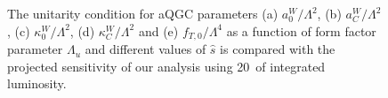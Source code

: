 \begin{figure}[hb]
\begin{center}
{    }
    \caption{\label{aqgc:uniBand} The unitarity condition for aQGC
    parameters (a) $a_0^W/\Lambda^2$, (b) $a_{C}^{W}/\Lambda^{2}$, (c) $\kappa_0^W/\Lambda^2$, (d) $\kappa_{C}^{W}/\Lambda^{2}$ and
    (e) $f_{T,0}/\Lambda^{4}$ as a function of form factor parameter
    $\Lambda_{u}$ and different values of $\hat{s}$ is compared with
    the projected sensitivity of our analysis using 20~\fbinv of integrated
    luminosity. }
  \end{center}
\end{figure}
\clearpage
